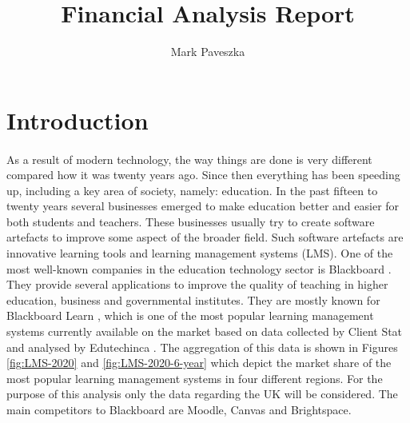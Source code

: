 \documentclass[]{article}
\title{Financial Analysis Report}
\author{Mark Paveszka}
\begin{document}
\maketitle

\newpage

\tableofcontents
\listoffigures
\listoftables

\newpage

\section{Introduction}
\paragraph{}
As a result of modern technology, the way things are done is very different compared how it was twenty years ago. Since then everything has been speeding up, including a key area of society, namely: education. In the past fifteen to twenty years several businesses emerged to make education better and easier for both students and teachers. These businesses usually try to create software artefacts to improve some aspect of the broader field. Such software artefacts are innovative learning tools and learning management systems (LMS). One of the most well-known companies in the education technology sector is Blackboard \cite{Blackboard_UK}. They provide several applications to improve the quality of teaching in higher education, business and governmental institutes. They are mostly known for Blackboard Learn \cite{Blackboard_Learn}, which is one of the most popular learning management systems currently available on the market based on data collected by Client Stat \cite{VLE-Data} and analysed by Edutechinca \cite{VLE-2020-IMG}. The aggregation of this data is shown in Figures \ref{fig:LMS-2020} and \ref{fig:LMS-2020-6-year} which depict the market share of the most popular learning management systems in four different regions. For the purpose of this analysis only the data regarding the UK will be considered. The main competitors to Blackboard are Moodle, Canvas and Brightspace. 
\end{document}
